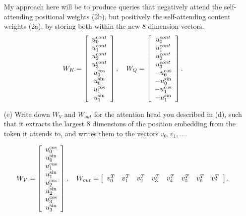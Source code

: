 \documentclass[11pt]{article}
\newenvironment{answerbox}%
  {\begin{mdframed}[linecolor=darkgray,%
                    roundcorner=10pt,innertopmargin=10pt,%
                    innerbottommargin=10pt,skipabove=12pt,skipbelow=12pt]}%
  {\end{mdframed}}
\begin{document}
\begin{itemize}
\begin{answerbox}
My approach here will be to produce queries that negatively attend the self-attending positional weights (2b), but positively the self-attending content weights (2a), by storing both within the new 8-dimension vectors.
$$
W_K = \left[
\begin{array}{*{1}c}
u^{cont}_0 \\
u^{cont}_1 \\
u^{cont}_2 \\
u^{cont}_3 \\
u^{\cos}_0 \\
u^{\sin}_0 \\
u^{\cos}_1 \\
u^{\sin}_1 \\
\end{array}
\right], \quad
W_Q = \left[
\begin{array}{*{1}c}
u^{cont}_0 \\
u^{cont}_1 \\
u^{cont}_2 \\
u^{cont}_3 \\
- u^{\cos}_0 \\
- u^{\sin}_0 \\
- u^{\cos}_1 \\
- u^{\sin}_1 \\
\end{array}
\right].
$$

\end{answerbox}


    \item[(e)] Write down $W_V$ and $W_{out}$ for the attention head you described in (d), such that it extracts the largest 8 dimensions of the position embedding from the token it attends to, and writes them to the vectors $v_0, v_1, \ldots$.

\begin{answerbox}
$$
W_V = \left[
\begin{array}{*{1}c}
u^{\cos}_0 \\
u^{\sin}_0 \\
u^{\cos}_1 \\
u^{\sin}_1 \\
u^{\cos}_2 \\
u^{\sin}_2 \\
u^{\cos}_3 \\
u^{\sin}_3 \\
\end{array}
\right], \quad
W_{out} = \left[
\begin{array}{*{8}c}
v_0^T & v_1^T & v_2^T & v_3^T & v_4^T & v_5^T & v_6^T & v_7^T
\end{array}
\right].
$$


\end{answerbox}
\end{itemize}
\end{document}
